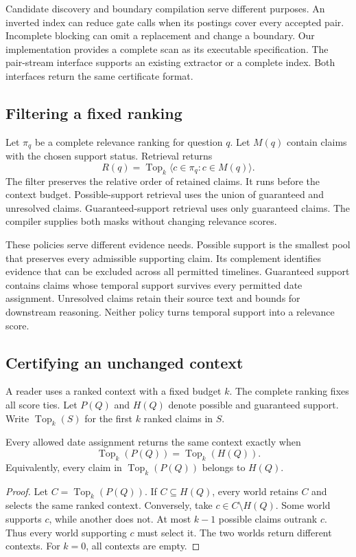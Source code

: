 Candidate discovery and boundary compilation serve different purposes.
An inverted index can reduce gate calls when its postings cover every accepted pair.
Incomplete blocking can omit a replacement and change a boundary.
Our implementation provides a complete scan as its executable specification.
The pair-stream interface supports an existing extractor or a complete index.
Both interfaces return the same certificate format.

\subsection{Filtering a fixed ranking}

Let $\pi_q$ be a complete relevance ranking for question $q$.
Let $M(q)$ contain claims with the chosen support status.
Retrieval returns
\begin{equation}
 R(q)=\operatorname{Top}_k\langle c\in\pi_q:c\in M(q)\rangle.
\label{eq:context}
\end{equation}
The filter preserves the relative order of retained claims.
It runs before the context budget.
Possible-support retrieval uses the union of guaranteed and unresolved claims.
Guaranteed-support retrieval uses only guaranteed claims.
The compiler supplies both masks without changing relevance scores.

These policies serve different evidence needs.
Possible support is the smallest pool that preserves every admissible supporting claim.
Its complement identifies evidence that can be excluded across all permitted timelines.
Guaranteed support contains claims whose temporal support survives every permitted date assignment.
Unresolved claims retain their source text and bounds for downstream reasoning.
Neither policy turns temporal support into a relevance score.


\subsection{Certifying an unchanged context}
A reader uses a ranked context with a fixed budget $k$.
The complete ranking fixes all score ties.
Let $P(Q)$ and $H(Q)$ denote possible and guaranteed support.
Write $\operatorname{Top}_k(S)$ for the first $k$ ranked claims in $S$.

\begin{theorem}
\label{thm:context-stability}
Every allowed date assignment returns the same context exactly when
\begin{equation}
 \operatorname{Top}_k(P(Q))=\operatorname{Top}_k(H(Q)).
\label{eq:context-stability}
\end{equation}
Equivalently, every claim in $\operatorname{Top}_k(P(Q))$ belongs to $H(Q)$.
\end{theorem}
\begin{proof}
Let $C=\operatorname{Top}_k(P(Q))$.
If $C\subseteq H(Q)$, every world retains $C$ and selects the same ranked context.
Conversely, take $c\in C\setminus H(Q)$.
Some world supports $c$, while another does not.
At most $k-1$ possible claims outrank $c$.
Thus every world supporting $c$ must select it.
The two worlds return different contexts.
For $k=0$, all contexts are empty.
\end{proof}

